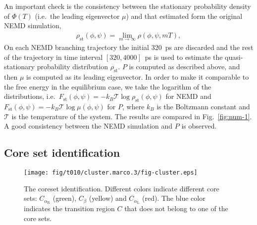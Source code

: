 \documentclass[aps, pre, preprint,unsortedaddress,a4paper,onecolumn]{revtex4}
\newcommand{\mymu}{\mu}
\newcommand{\dih}{\textrm{dih}}
\newcommand{\confaa}[0]{{\alpha_{\textrm{R}}}}
\newcommand{\confc}[0]{{\alpha_{\textrm{L}}}}
\begin{document}
An important check is the consistency between the
stationary probability density of $\Phi(T)$ (i.e.~the leading eigenvector $\mymu$) and that 
estimated form the original NEMD simulation,
\begin{align}
  \label{eq:num-tmp1}
  \rho_{\textrm{st}}(\phi,\psi) = \lim_{m\rightarrow\infty} \rho (\phi,\psi,mT),
\end{align}
On each NEMD branching trajectory the initial 320~ps are discarded and
the rest of the trajectory in time interval $[320,4000]$~ps is used to estimate
the quasi-stationary probability distribution $\rho_{\textrm{st}}$. 
$P$ is computed as described above, and then $\mymu$ is computed as its leading eigenvector. In order to make it comparable to the free energy in the equilibrium case, we take
the logarithm of the distributions, i.e.~$F_{\textrm{st}}(\phi,\psi)=
-k_B\mathcal T\log \rho_{\textrm{st}}(\phi,\psi)$
for NEMD and $F_{\textrm{st}}(\phi,\psi)=
-k_B\mathcal T\log \mu(\phi,\psi)$ for $P$, where $k_B$ is the
Boltzmann constant and $\mathcal T$ is the temperature of the system.
The
results are  compared in Fig.~\ref{fig:num-1}. A good consistency between
the  NEMD simulation and 
$P$ is observed.  


\subsection{Core set identification}

\begin{figure}
  \centering
  \texttt{[image: fig/t010/cluster.marco.3/fig-cluster.eps]}
  \caption{The coreset identification. Different colors indicate different core sets: $C_{\confaa}$ (green), $C_\beta$ (yellow) and $C_{\confc}$ (red).
    The blue color indicates the transition region $C$ that does not belong to one of the core sets.}
  \label{fig:cluster}
\end{figure}
\end{document}
